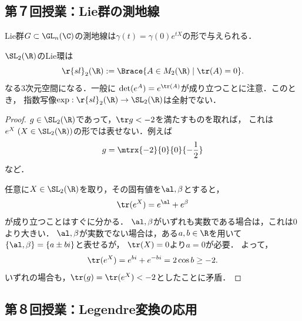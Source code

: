 \documentclass[uplatex,dvipdfmx]{jsarticle}
\begin{document}
\subsection{第７回授業：Lie群の測地線}

\begin{exercise}[指数写像と行列の指数関数]
    Lie群$G\subset\GL_n(\C)$の測地線は$\gamma(t)=\gamma(0)e^{tX}$の形で与えられる．
\end{exercise}

\begin{exercise}[de Sitter空間の例]
    $\SL_2(\R)$のLie環は
    \[\r{sl}_2(\R):=\Brace{A\in M_2(\R)\mid\tr(A)=0}.\]
    なる3次元空間になる．一般に
    $\det(e^A)=e^{\tr(A)}$が成り立つことに注意．このとき，
    指数写像$\exp:\r{sl}_2(\R)\to\SL_2(\R)$は全射でない．
\end{exercise}
\begin{proof}
    $g\in\SL_2(\R)$であって，$\tr g<-2$を満たすものを取れば，
    これは$e^X\;(X\in \SL_2(\R))$の形では表せない．例えば
    \[g=\mtrx{-2}{0}{0}{-\frac{1}{2}}\]
    など．
    
    任意に$X\in \SL_2(\R)$を取り，その固有値を$\al,\beta$とすると，
    \[\tr(e^X)=e^\al+e^\beta\]
    が成り立つことはすぐに分かる．
    $\al,\beta$がいずれも実数である場合は，これは$0$より大きい．
    $\al,\beta$が実数でない場合は，ある$a,b\in\R$を用いて$\{\al,\beta\}=\{a\pm bi\}$と表せるが，
    $\tr(X)=0$より$a=0$が必要．
    よって，
    \[\tr(e^X)=e^{bi}+e^{-bi}=2\cos b\ge-2.\]
    いずれの場合も，$\tr(g)=\tr(e^X)<-2$としたことに矛盾．
\end{proof}

\subsection{第８回授業：Legendre変換の応用}
\end{document}
